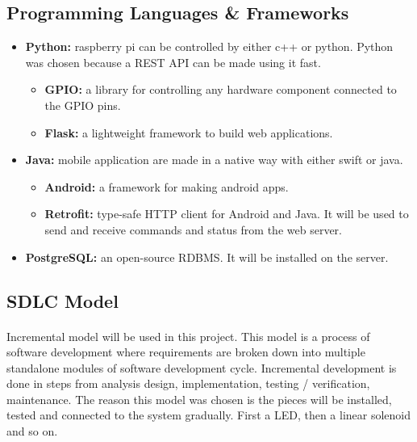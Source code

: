 \documentclass[12pt, oneside, a4paper]{book}
\newcommand\boldcolor[1]{\textcolor{bold}{\textbf{#1}}}
\begin{document}
			\subsection{Programming Languages \& Frameworks}
				\begin{itemize}
					
					\item \boldcolor{Python:} raspberry pi can be controlled by either c++ or python. Python was chosen because a REST API can be made using it fast.
		 				\begin{itemize}
		 					\item \textbf{GPIO:} a library for controlling any hardware component connected to the GPIO pins\cite{gpio}.
		 					\item \textbf{Flask:} a lightweight framework to build web applications.
						\end{itemize}
					\item \boldcolor{Java:} mobile application are made in a native way with either swift or java.
						\begin{itemize}
							\item \textbf{Android:} a framework for making android apps.
							\item \textbf{Retrofit:} type-safe HTTP client for Android and Java\cite{retro}. It will be used to send and receive commands and status from the web server.
							
						\end{itemize}
					\item \boldcolor{PostgreSQL:} an open-source RDBMS\cite{postgres}. It will be installed on the server.
				\end{itemize}
			
			\subsection{SDLC Model}
			\paragraph{} Incremental model will be used in this project. This model is a process of software development where requirements are broken down into multiple standalone modules of software development cycle. Incremental development is done in steps from analysis design, implementation, testing / verification, maintenance\cite{sdlc}. The reason this model was chosen is the pieces will be installed, tested and connected to the system gradually. First a LED, then a linear solenoid and so on.
			
\end{document}
